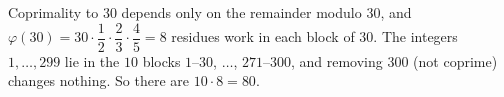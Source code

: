 Coprimality to $30$ depends only on the remainder modulo $30$, and $\varphi(30)=30\cdot\dfrac12\cdot\dfrac23\cdot\dfrac45=8$ residues work in each block of $30$. The integers $1,\dots,299$ lie in the $10$ blocks $1$--$30$, $\dots$, $271$--$300$, and removing $300$ (not coprime) changes nothing. So there are $10\cdot8=\boxed{80}$.
